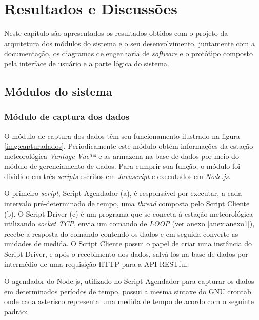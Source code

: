 \chapter{Resultados e Discussões} \label{ch:RD}


Neste capítulo são apresentados os resultados obtidos com o projeto da arquitetura dos módulos do sistema e o seu desenvolvimento, juntamente com a documentação, os diagramas de engenharia de \textit{software} e o protótipo composto pela interface de usuário e a parte lógica do sistema.


\section{Módulos do sistema} \label{subsec:modules}

\subsection{Módulo de captura dos dados} 

O módulo de captura dos dados têm seu funcionamento ilustrado na figura \ref{img:capturadados}. Periodicamente este módulo obtém informações da estação meteorológica \textit{Vantage Vue™} e as armazena na base de dados por meio do módulo de gerenciamento de dados. Para cumprir sua função, o módulo foi dividido em três \textit{scripts} escritos em \textit{Javascript} e executados em \textit{Node.js}. 


O primeiro \textit{script}, Script Agendador (a), é responsável por executar, a cada intervalo pré-determinado de tempo, uma \textit{thread} composta pelo Script Cliente (b). O Script Driver (c) é um programa que se conecta à estação meteorológica utilizando \textit{socket TCP}, envia um comando de \textit{LOOP} (ver anexo \ref{anex:anexo1}), recebe a resposta do comando contendo os dados e em seguida converte as unidades de medida. O Script Cliente possui o papel de criar uma instância do Script Driver, e após o recebimento dos dados, salvá-los na base de dados por intermédio de uma requisição HTTP para a API RESTful.

O agendador do Node.js, utilizado no Script Agendador para capturar os dados em determinados períodos de tempo, possui a mesma sintaxe do GNU crontab \cite{SITEGNUCRONTAB, SITEVIVALINUXCRONTAB, NODECRON} onde cada asterisco representa uma medida de tempo de acordo com o seguinte padrão:
 
